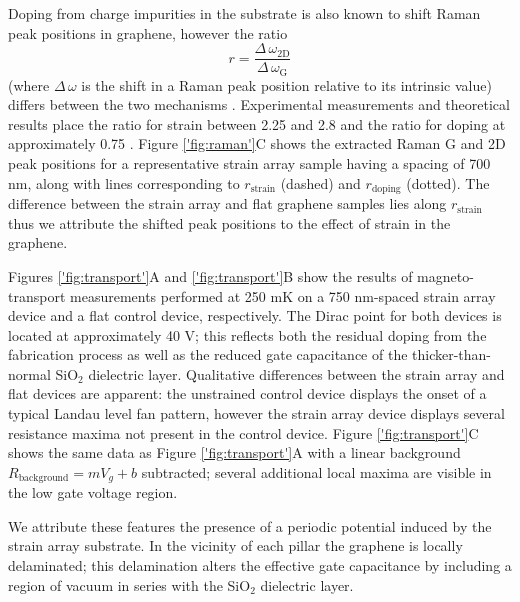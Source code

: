 \documentclass[%
 aip,
 apl,%
 amsmath,amssymb,
 reprint,%
]{revtex4-1}
\begin{document}
Doping from charge impurities in the substrate is also known to 
shift Raman peak positions in graphene\cite{reina2008large, casiraghi2007raman}, however the ratio 
\begin{equation}
    r = \frac{\Delta \, \omega_\text{2D}}{\Delta \, \omega_\text{G}}
\end{equation}
(where $\Delta \, \omega$ is the shift in a Raman peak position relative to its intrinsic value)
differs between the two mechanisms \cite{lee2012optical}. 
Experimental measurements \cite{zabel2012raman, metzger2009biaxial, ding2010stretchable} 
and theoretical results\cite{mohr2010splitting, mohiuddin2009uniaxial} place the ratio for strain 
between 2.25 and 2.8 and the ratio for doping at approximately 0.75 \cite{lee2012optical}. 
Figure \ref{'fig:raman'}C shows the extracted Raman G and 2D peak positions for a representative
strain array sample having a spacing of 700 nm,
along with lines corresponding to $r_\text{strain}$ (dashed) and $r_\text{doping}$ (dotted). 
The difference between the strain array and flat graphene samples lies along $r_\text{strain}$ thus we
attribute the shifted peak positions to the effect of strain in the graphene.



Figures \ref{'fig:transport'}A and \ref{'fig:transport'}B show the results of magneto-transport 
measurements performed at 250 mK on a 750 nm-spaced strain array device and a flat control device, respectively.
The Dirac point for both devices is located at approximately 40 V; this reflects both the residual doping
from the fabrication process as well as the reduced gate capacitance of the thicker-than-normal SiO$_2$ dielectric layer.
Qualitative differences between the strain array and flat devices are apparent: 
the unstrained control device displays the onset of a typical Landau level fan pattern\cite{bolotin2009observation}, 
however the strain array device displays several resistance maxima not present in the control device.
Figure \ref{'fig:transport'}C shows the same data as Figure \ref{'fig:transport'}A with a linear background 
$R_\text{background} = m V_g + b$ subtracted; several additional local maxima are visible in the low gate voltage region.

We attribute these features the presence of a periodic potential induced by the strain array substrate.
In the vicinity of each pillar the graphene is locally delaminated; this delamination alters the 
effective gate capacitance by including a region of vacuum in series with the SiO$_2$ dielectric layer.
\end{document}
